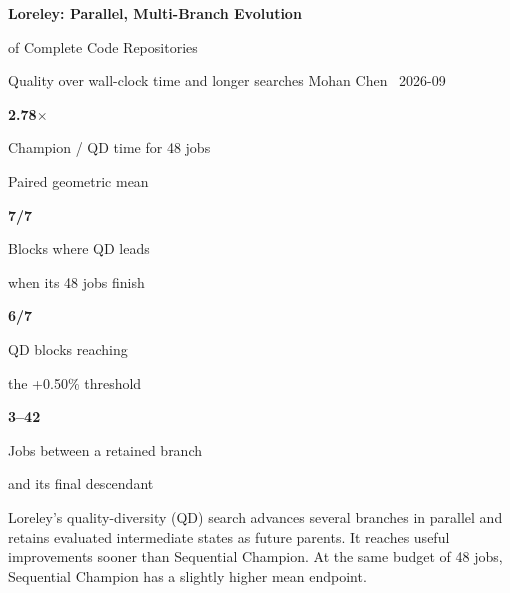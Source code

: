\documentclass[10pt,a4paper]{article}
\newcommand{\metriccard}[3]{%
  \begin{minipage}[t][19mm][c]{0.235\textwidth}
    \centering
    {\color{#3}\fontsize{20}{21}\selectfont\bfseries #1}\par
    {\color{muted}\scriptsize #2}
  \end{minipage}%
}
\newcommand{\callout}[2]{%
  \colorbox{bluepale}{%
    \parbox{\dimexpr\linewidth-2\fboxsep\relax}{%
      \vspace{2pt}{\color{blue}\bfseries #1}\quad #2\vspace{2pt}%
    }%
  }%
}
\begin{document}
\thispagestyle{fancy}
\vspace*{-3mm}
{\color{ink}\fontsize{25}{27}\selectfont\bfseries
Loreley: Parallel, Multi-Branch Evolution\par
of Complete Code Repositories}\par
\vspace{2pt}
{\color{muted}\fontsize{12}{14}\selectfont
Quality over wall-clock time and longer searches}\hfill
{\small Mohan Chen \textperiodcentered\ 2026-09}\par
\vspace{5pt}

\colorbox{surface}{\parbox{\dimexpr\textwidth-2\fboxsep\relax}{%
\vspace{3pt}
\metriccard{2.78$\times$}{Champion / QD time for 48 jobs\par Paired geometric mean}{blue}\hfill
\metriccard{7/7}{Blocks where QD leads\par when its 48 jobs finish}{green}\hfill
\metriccard{6/7}{QD blocks reaching\par the +0.50\% threshold}{blue}\hfill
\metriccard{3--42}{Jobs between a retained branch\par and its final descendant}{orange}
\vspace{3pt}}}

\vspace{6pt}
\callout{Main result}{Loreley's quality-diversity (QD) search advances several branches in parallel and retains evaluated intermediate states as future parents. It reaches useful improvements sooner than Sequential Champion. At the same budget of 48 jobs, Sequential Champion has a slightly higher mean endpoint.}
\end{document}

